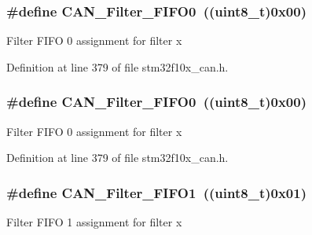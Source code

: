 \subsubsection[{\texorpdfstring{C\+A\+N\+\_\+\+Filter\+\_\+\+F\+I\+F\+O0}{CAN_Filter_FIFO0}}]{\setlength{\rightskip}{0pt plus 5cm}\#define C\+A\+N\+\_\+\+Filter\+\_\+\+F\+I\+F\+O0~(({\bf uint8\+\_\+t})0x00)}\hypertarget{group___c_a_n__filter___f_i_f_o_ga8249c27978ca94676530540b88a6be8f}{}\label{group___c_a_n__filter___f_i_f_o_ga8249c27978ca94676530540b88a6be8f}
Filter F\+I\+FO 0 assignment for filter x 

Definition at line 379 of file stm32f10x\+\_\+can.\+h.

\subsubsection[{\texorpdfstring{C\+A\+N\+\_\+\+Filter\+\_\+\+F\+I\+F\+O0}{CAN_Filter_FIFO0}}]{\setlength{\rightskip}{0pt plus 5cm}\#define C\+A\+N\+\_\+\+Filter\+\_\+\+F\+I\+F\+O0~(({\bf uint8\+\_\+t})0x00)}\hypertarget{group___c_a_n__filter___f_i_f_o_ga8249c27978ca94676530540b88a6be8f}{}\label{group___c_a_n__filter___f_i_f_o_ga8249c27978ca94676530540b88a6be8f}
Filter F\+I\+FO 0 assignment for filter x 

Definition at line 379 of file stm32f10x\+\_\+can.\+h.

\subsubsection[{\texorpdfstring{C\+A\+N\+\_\+\+Filter\+\_\+\+F\+I\+F\+O1}{CAN_Filter_FIFO1}}]{\setlength{\rightskip}{0pt plus 5cm}\#define C\+A\+N\+\_\+\+Filter\+\_\+\+F\+I\+F\+O1~(({\bf uint8\+\_\+t})0x01)}\hypertarget{group___c_a_n__filter___f_i_f_o_gaab8478c89a607c4b8baf68efc730e316}{}\label{group___c_a_n__filter___f_i_f_o_gaab8478c89a607c4b8baf68efc730e316}
Filter F\+I\+FO 1 assignment for filter x 


